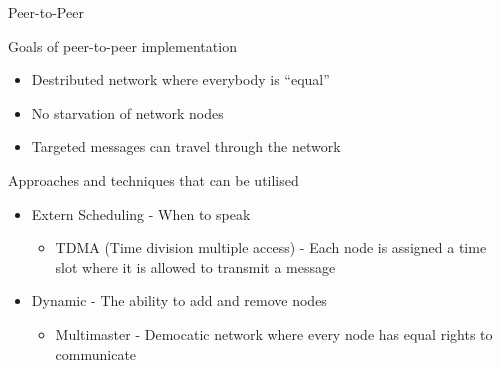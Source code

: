 \begin{frame}{Peer-to-Peer}
	\begin{block}{Goals of peer-to-peer implementation}
		\begin{itemize}
			\item \textcolor{ReneOrange}{Destributed} network where everybody is ``equal''
			\item No \textcolor{ReneOrange}{starvation} of network nodes
			\item Targeted messages can travel through the network
		\end{itemize}	
	\end{block}
	\begin{block}{Approaches and techniques that can be utilised}
		\begin{itemize}
			\item \textcolor{ReneOrange}{Extern Scheduling} - When to speak
			\begin{itemize}
				\item TDMA (Time division multiple access) - Each node is assigned a time slot where it is allowed to transmit a message				
			\end{itemize}
			\item \textcolor{ReneOrange}{Dynamic} - The ability to add and remove nodes
			\begin{itemize}
				\item \textcolor{ReneOrange}{Multimaster} - Democatic network where every node has equal rights to communicate 
			\end{itemize}		
		\end{itemize}	
	\end{block}	
		
\end{frame}
